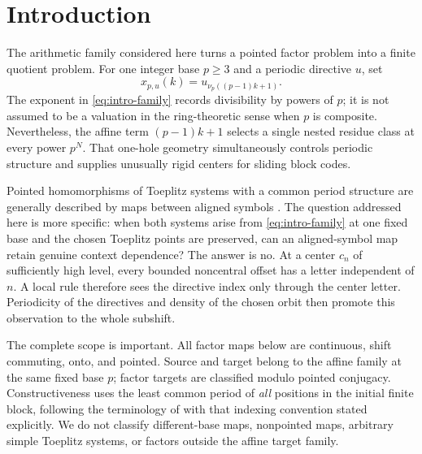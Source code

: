 \section{Introduction}
\label{sec:introduction}

The arithmetic family considered here turns a pointed factor problem into
a finite quotient problem.  For one integer base $p\geq3$ and a periodic
directive $u$, set
\begin{equation}
  x_{p,u}(k)=u_{\nu_p((p-1)k+1)} .
  \label{eq:intro-family}
\end{equation}
The exponent in \cref{eq:intro-family} records divisibility by powers of
$p$; it is not assumed to be a valuation in the ring-theoretic sense when
$p$ is composite.  Nevertheless, the affine term $(p-1)k+1$ selects a
single nested residue class at every power $p^N$.  That one-hole geometry
simultaneously controls periodic structure and supplies unusually rigid
centers for sliding block codes.

Pointed homomorphisms of Toeplitz systems with a common period structure
are generally described by maps between aligned symbols
\citep{DKL1995}.  The question addressed here is more specific: when both
systems arise from \cref{eq:intro-family} at one fixed base and the chosen
Toeplitz points are preserved, can an aligned-symbol map retain genuine
context dependence?  The answer is no.  At a center $c_n$ of sufficiently
high level, every bounded noncentral offset has a letter independent of
$n$.  A local rule therefore sees the directive index only through the
center letter.  Periodicity of the directives and density of the chosen
orbit then promote this observation to the whole subshift.

The complete scope is important.  All factor maps below are continuous,
shift commuting, onto, and pointed.  Source and target belong to the affine
family at the same fixed base $p$; factor targets are classified modulo
pointed conjugacy.  Constructiveness uses the least common period of
\emph{all} positions in the initial finite block, following the terminology
of \citet{HosseiniYassawi2026} with that indexing convention stated
explicitly.  We do not classify different-base maps, nonpointed maps,
arbitrary simple Toeplitz systems, or factors outside the affine target
family.

